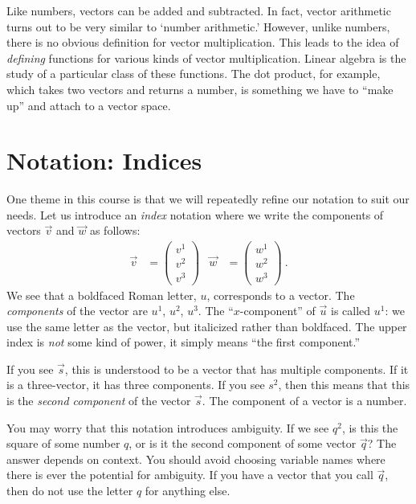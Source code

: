 \documentclass[12pt, oneside]{report}    %
\let\oldsection\section
\def\section{%
  \setcounter{sidenote}{1}%
  \oldsection
}
\begin{document}
Like numbers, vectors can be added and subtracted. In fact, vector arithmetic turns out to be very similar to `number arithmetic.' However, unlike numbers, there is no obvious definition for vector multiplication. This leads to the idea of \emph{defining} functions for various kinds of vector multiplication. Linear algebra is the study of a particular class of these functions. The dot product, for example, which takes two vectors and returns a number, is something we have to ``make up'' and attach to a vector space.



\section{Notation: Indices}

One theme in this course is that we will repeatedly refine our notation to suit our needs. Let us introduce an \emph{index} notation where we write the components of vectors $\vec{v}$ and $\vec{w}$ as follows:
\begin{align}
    \vec{v}
    &=
    \begin{pmatrix}
        v^1 \\ v^2 \\ v^3
    \end{pmatrix}
    &
    \vec{w}
    &=
    \begin{pmatrix}
        w^1 \\ w^2 \\ w^3
    \end{pmatrix} \ .
\end{align}
We see that a boldfaced Roman letter, $u$, corresponds to a vector. The \emph{components} of the vector are $u^1$, $u^2$, $u^3$. The ``$x$-component'' of $\vec{u}$ is called $u^1$: we use the same letter as the vector, but italicized rather than boldfaced. The upper index is \emph{not} some kind of power, it simply means ``the first component.'' 

\begin{example}
If you see $\vec{s}$, this is understood to be a vector that has multiple components. If it is a three-vector, it has three components. If you see $s^2$, then this means that this is the \emph{second component} of the vector $\vec{s}$. The component of a vector is a number. 
\end{example}

You may worry that this notation introduces ambiguity. If we see $q^2$, is this the square of some number $q$, or is it the second component of some vector $\vec{q}$? The answer depends on context. You should avoid choosing variable names where there is ever the potential for ambiguity. If you have a vector that you call $\vec{q}$, then do not use the letter $q$ for anything else.
\end{document}
